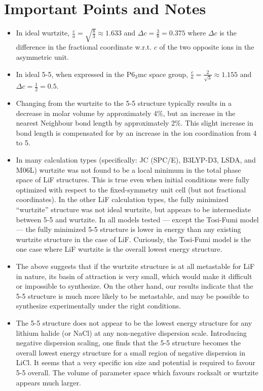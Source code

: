 \documentclass[preprint,aps,prb,floatfix]{revtex4-1}
\begin{document}
\section{Important Points and Notes}
\begin{itemize}
	\item In ideal wurtzite, $\frac{c}{a} = \sqrt{\frac{8}{3}} \approx 1.633$ and $\Delta c = \frac{3}{8} = 0.375$ where $\Delta c$ is the difference in the fractional coordinate w.r.t. $c$ of the two opposite ions in the asymmetric unit.
	\item In ideal 5-5, when expressed in the P6$_{3}$mc space group, $\frac{c}{a} = \frac{2}{\sqrt{3}} \approx 1.155$ and $\Delta c = \frac{1}{2} = 0.5$.
	\item Changing from the wurtzite to the 5-5 structure typically results in a decrease in molar volume by approximately 4\%, but an increase in the nearest Neighbour bond length by approximately 2\%. This slight increase in bond length is compensated for by an increase in the ion coordination from 4 to 5.
	\item In many calculation types (specifically: JC (SPC/E), B3LYP-D3, LSDA, and M06L) wurtzite was not found to be a local minimum in the total phase space of LiF structures. This is true even when initial conditions were fully optimized with respect to the fixed-symmetry unit cell (but not fractional coordinates). In the other LiF calculation types, the fully minimized ``wurtzite'' structure was not ideal wurtzite, but appears to be intermediate between 5-5 and wurtzite. In all models tested --- except the Tosi-Fumi model --- the fully minimized 5-5 structure is lower in energy than any existing wurtzite structure in the case of LiF. Curiously, the Tosi-Fumi model is the one case where LiF wurtzite is the overall lowest energy structure.
	\item The above suggests that if the wurtzite structure is at all metastable for LiF in nature, its basin of attraction is very small, which would make it difficult or impossible to synthesize. On the other hand, our results indicate that the 5-5 structure is much more likely to be metastable, and may be possible to synthesize experimentally under the right conditions.
	\item The 5-5 structure does not appear to be the lowest energy structure for any lithium halide (or NaCl) at any non-negative dispersion scale. Introducing negative dispersion scaling, one finds that the 5-5 structure becomes the overall lowest energy structure for a small region of negative dispersion in LiCl. It seems that a very specific ion size and potential is required to favour 5-5 overall. The volume of parameter space which favours rocksalt or wurtzite appears much larger.

\end{itemize}
\end{document}
